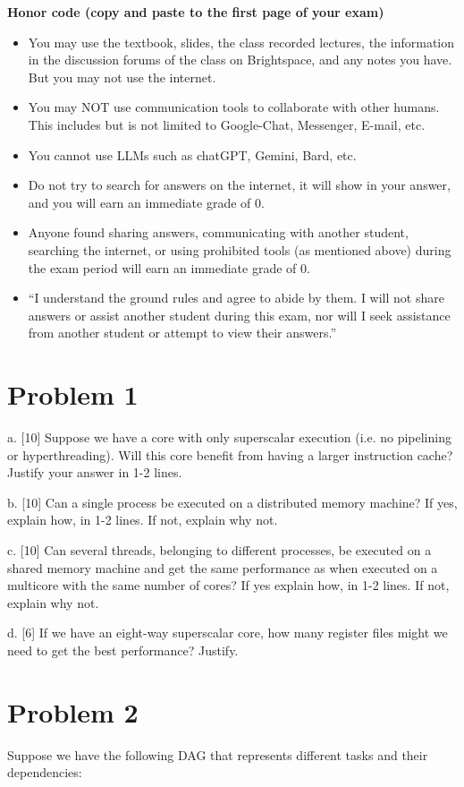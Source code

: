 \documentclass{article}
\begin{document}
\textbf{Honor code (copy and paste to the first page of your exam)}
\begin{itemize}
    \item You may use the textbook, slides, the class recorded lectures, the information in the discussion forums of the class on Brightspace, and any notes you have. But you may not use the internet.
    \item You may NOT use communication tools to collaborate with other humans. This includes but is not limited to Google-Chat, Messenger, E-mail, etc.
    \item You cannot use LLMs such as chatGPT, Gemini, Bard, etc.
    \item Do not try to search for answers on the internet, it will show in your answer, and you will earn an immediate grade of 0.
    \item Anyone found sharing answers, communicating with another student, searching the internet, or using prohibited tools (as mentioned above) during the exam period will earn an immediate grade of 0.
    \item ``I understand the ground rules and agree to abide by them. I will not share answers or assist another student during this exam, nor will I seek assistance from another student or attempt to view their answers.''
\end{itemize}

\section*{Problem 1}
a. [10]  Suppose we have a core with only superscalar execution (i.e. no pipelining or hyperthreading). Will this core benefit from having a larger instruction cache? Justify your answer in 1-2 lines.

b. [10] Can a single process be executed on a distributed memory machine? If yes, explain how, in 1-2 lines. If not, explain why not.

c. [10] Can several threads, belonging to different processes, be executed on a shared memory machine and get the same performance as when executed on a multicore with the same number of cores? If yes explain how, in 1-2 lines. If not, explain why not.

d. [6] If we have an eight-way superscalar core, how many register files might we need to get the best performance? Justify.


\section*{Problem 2}
Suppose we have the following DAG that represents different tasks and their dependencies:
\end{document}
